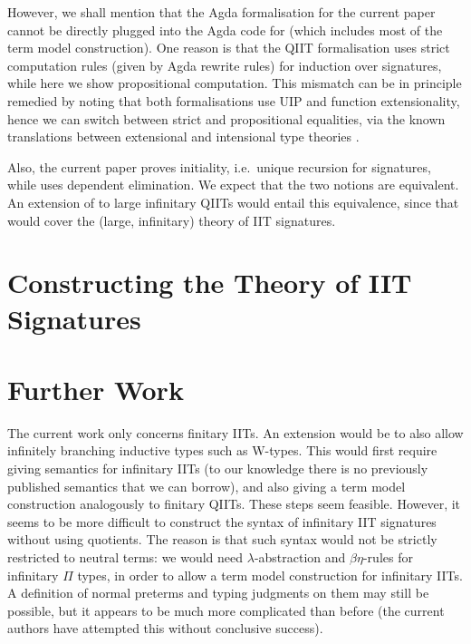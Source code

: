 \documentclass[a4paper,UKenglish,cleveref, autoref]{lipics-v2019}
\begin{document}
However, we shall mention that the Agda formalisation for the current paper
cannot be directly plugged into the Agda code for
\cite{Kaposi:2019:CQI:3302515.3290315} (which includes most of the term model
construction). One reason is that the QIIT formalisation uses strict computation
rules (given by Agda rewrite rules) for induction over signatures, while here we show propositional
computation. This mismatch can be in principle remedied by noting that both
formalisations use UIP and function extensionality, hence we can switch between
strict and propositional equalities, via the known translations between
extensional and intensional type
theories \cite{hofmann95extensional,winterhalter2019eliminating}.

Also, the current paper proves initiality, i.e.\ unique recursion for
signatures, while \cite{Kaposi:2019:CQI:3302515.3290315} uses dependent
elimination. We expect that the two notions are equivalent. An extension of
\cite{Kaposi:2019:CQI:3302515.3290315} to large infinitary QIITs would entail
this equivalence, since that would cover the (large, infinitary) theory of IIT
signatures.


\section{Constructing the Theory of IIT Signatures}
\label{sec:ambroise}




\section{Further Work}

The current work only concerns finitary IITs. An extension would be to also
allow infinitely branching inductive types such as W-types. This would first
require giving semantics for infinitary IITs (to our knowledge there is no
previously published semantics that we can borrow), and also giving a term model
construction analogously to finitary QIITs. These steps seem feasible. However,
it seems to be more difficult to construct the syntax of infinitary IIT
signatures without using quotients. The reason is that such syntax would not be
strictly restricted to neutral terms: we would need $\lambda$-abstraction and
$\beta\eta$-rules for infinitary $\Pi$ types, in order to allow a term model
construction for infinitary IITs. A definition of normal preterms and typing
judgments on them may still be possible, but it appears to be much more
complicated than before (the current authors have attempted this without
conclusive success).
\end{document}
